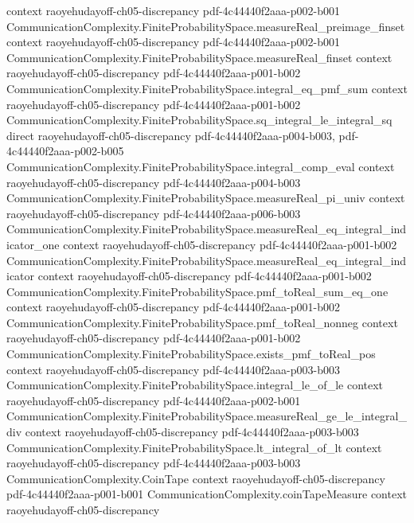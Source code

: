\begin{lemma}
  {context}
  {raoyehudayoff-ch05-discrepancy}
  {pdf-4c44440f2aaa-p002-b001}
\proofstep
  {CommunicationComplexity.FiniteProbabilitySpace.measureReal_preimage_finset}
  {context}
  {raoyehudayoff-ch05-discrepancy}
  {pdf-4c44440f2aaa-p002-b001}
\proofstep
  {CommunicationComplexity.FiniteProbabilitySpace.measureReal_finset}
  {context}
  {raoyehudayoff-ch05-discrepancy}
  {pdf-4c44440f2aaa-p001-b002}
\proofstep
  {CommunicationComplexity.FiniteProbabilitySpace.integral_eq_pmf_sum}
  {context}
  {raoyehudayoff-ch05-discrepancy}
  {pdf-4c44440f2aaa-p001-b002}
\proofstep
  {CommunicationComplexity.FiniteProbabilitySpace.sq_integral_le_integral_sq}
  {direct}
  {raoyehudayoff-ch05-discrepancy}
  {pdf-4c44440f2aaa-p004-b003,
    pdf-4c44440f2aaa-p002-b005}
\proofstep
  {CommunicationComplexity.FiniteProbabilitySpace.integral_comp_eval}
  {context}
  {raoyehudayoff-ch05-discrepancy}
  {pdf-4c44440f2aaa-p004-b003}
\proofstep
  {CommunicationComplexity.FiniteProbabilitySpace.measureReal_pi_univ}
  {context}
  {raoyehudayoff-ch05-discrepancy}
  {pdf-4c44440f2aaa-p006-b003}
\proofstep
  {CommunicationComplexity.FiniteProbabilitySpace.measureReal_eq_integral_indicator_one}
  {context}
  {raoyehudayoff-ch05-discrepancy}
  {pdf-4c44440f2aaa-p001-b002}
\proofstep
  {CommunicationComplexity.FiniteProbabilitySpace.measureReal_eq_integral_indicator}
  {context}
  {raoyehudayoff-ch05-discrepancy}
  {pdf-4c44440f2aaa-p001-b002}
\proofstep
  {CommunicationComplexity.FiniteProbabilitySpace.pmf_toReal_sum_eq_one}
  {context}
  {raoyehudayoff-ch05-discrepancy}
  {pdf-4c44440f2aaa-p001-b002}
\proofstep
  {CommunicationComplexity.FiniteProbabilitySpace.pmf_toReal_nonneg}
  {context}
  {raoyehudayoff-ch05-discrepancy}
  {pdf-4c44440f2aaa-p001-b002}
\proofstep
  {CommunicationComplexity.FiniteProbabilitySpace.exists_pmf_toReal_pos}
  {context}
  {raoyehudayoff-ch05-discrepancy}
  {pdf-4c44440f2aaa-p003-b003}
\proofstep
  {CommunicationComplexity.FiniteProbabilitySpace.integral_le_of_le}
  {context}
  {raoyehudayoff-ch05-discrepancy}
  {pdf-4c44440f2aaa-p002-b001}
\proofstep
  {CommunicationComplexity.FiniteProbabilitySpace.measureReal_ge_le_integral_div}
  {context}
  {raoyehudayoff-ch05-discrepancy}
  {pdf-4c44440f2aaa-p003-b003}
\proofstep
  {CommunicationComplexity.FiniteProbabilitySpace.lt_integral_of_lt}
  {context}
  {raoyehudayoff-ch05-discrepancy}
  {pdf-4c44440f2aaa-p003-b003}
\proofstep
  {CommunicationComplexity.CoinTape}
  {context}
  {raoyehudayoff-ch05-discrepancy}
  {pdf-4c44440f2aaa-p001-b001}
\proofstep
  {CommunicationComplexity.coinTapeMeasure}
  {context}
  {raoyehudayoff-ch05-discrepancy}

\end{lemma}
